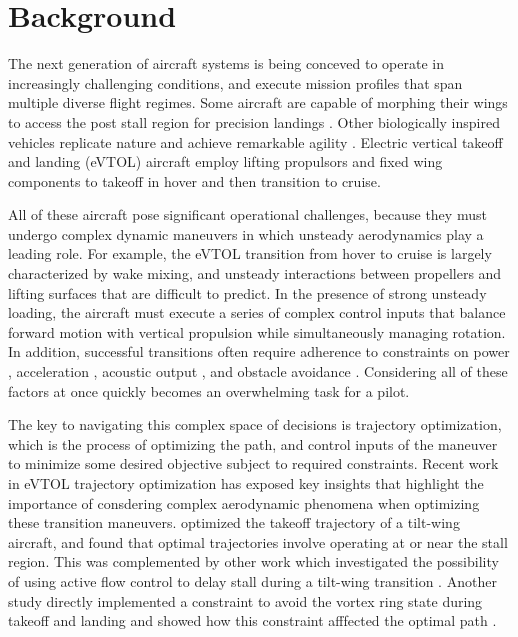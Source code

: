 \documentclass[12pt, letterpaper]{article}
\begin{document}
\section{Background}


The next generation of aircraft systems is being conceved to operate in increasingly challenging conditions, and execute mission profiles that span multiple diverse flight regimes.  Some aircraft are capable of morphing their wings to access the post stall region for precision landings \cite{bakhshi2025coupled}.  Other biologically inspired vehicles replicate nature and achieve remarkable agility \cite{lee2022transition, tian2020cfd}.  Electric vertical takeoff and landing (eVTOL) aircraft employ lifting propulsors and fixed wing components to takeoff in hover and then transition to cruise.  

All of these aircraft pose significant operational challenges, because they must undergo complex dynamic maneuvers in which unsteady aerodynamics play a leading role.  For example, the eVTOL transition from hover to cruise is largely characterized by wake mixing, and unsteady interactions between propellers and lifting surfaces that are difficult to predict.  In the presence of strong unsteady loading, the aircraft must execute a series of complex control inputs that balance forward motion with vertical propulsion while simultaneously managing rotation. In addition, successful transitions often require adherence to constraints on power \cite{moradi2024urban}, acceleration \cite{xiang2024autonomous}, acoustic output \cite{raza2025noise}, and obstacle avoidance \cite{shukla2025trajectory}. Considering all of these factors at once quickly becomes an overwhelming task for a pilot.

The key to navigating this complex space of decisions is trajectory optimization, which is the process of optimizing the path, and control inputs of the maneuver to minimize some desired objective subject to required constraints.  Recent work in eVTOL trajectory optimization has exposed key insights that highlight the importance of consdering complex aerodynamic phenomena when optimizing these transition maneuvers.  \cite{chauhan2020tilt} optimized the takeoff trajectory of a tilt-wing aircraft, and found that optimal trajectories involve operating at or near the stall region.  This was complemented by other work which investigated the possibility of using active flow control to delay stall during a tilt-wing transition \cite{panish2025tiltwing}. Another study directly implemented a constraint to avoid the vortex ring state during takeoff and landing and showed how this constraint afffected the optimal path \cite{park2023trajectory}.
\end{document}
